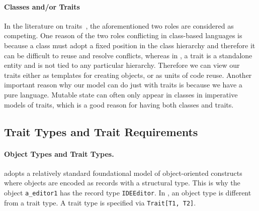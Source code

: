 \paragraph{Classes and/or Traits}

In the literature on traits~\citep{Ducasse_2006, scharli2003traits}, the
aforementioned two roles are considered as competing. One reason of the two
roles conflicting in class-based languages is because a class must adopt a fixed
position in the class hierarchy and therefore it can be difficult to reuse and
resolve conflicts, whereas in \sedel, a trait is a standalone entity and is not
tied to any particular hierarchy. Therefore we can view our traits either as templates for creating objects,
or as units of code reuse. Another important reason why our
model can do just with traits is because we have a pure language. Mutable state
can often only appear in classes in imperative models of traits, which is a good
reason for having both classes and traits.





\subsection{Trait Types and Trait Requirements}

\paragraph{Object Types and Trait Types.}
\sedel adopts a relatively standard foundational model of object-oriented
constructs~\citep{DBLP:conf/ecoop/LeeASP15} where objects are encoded as records
with a structural type. This is why the object \lstinline{a_editor1}
has the record type \lstinline{IDEEditor}. In \sedel, an object type is
different from a trait type. A trait type is specified via \lstinline{Trait[T1, T2]}.

